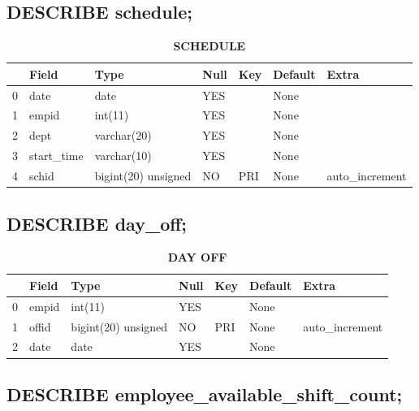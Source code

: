 \documentclass{article} %
\begin{document}
\subsection*{DESCRIBE schedule;}


\begin{table}[H]
	\centering
	\caption{\textbf{SCHEDULE}}
\begin{tabular}{|p{2cm}|p{2cm}|p{2cm}|p{2cm}|p{2cm}|p{2cm}|p{2cm}|}
	\hline
	\toprule
	{} &       Field &                 Type & Null &  Key & Default &           Extra \\
	\hline
	\midrule
	0 &        date &                 date &  YES &      &    None &                 \\
	1 &       empid &              int(11) &  YES &      &    None &                 \\
	2 &        dept &          varchar(20) &  YES &      &    None &                 \\
	3 &  start\_time &          varchar(10) &  YES &      &    None &                 \\
	4 &       schid &  bigint(20) unsigned &   NO &  PRI &    None &  auto\_increment \\
	\bottomrule
	\hline
\end{tabular}
\end{table}


\subsection*{DESCRIBE day\_off;}
\begin{table}[H]
	\centering
	\caption{\textbf{DAY OFF}}
\begin{tabular}{|p{2cm}|p{2cm}|p{2cm}|p{2cm}|p{2cm}|p{2cm}|p{2cm}|}
	\hline
	\toprule
	{} &  Field &                 Type & Null &  Key & Default &           Extra \\
	\hline
	\midrule
	0 &  empid &              int(11) &  YES &      &    None &                 \\
	1 &  offid &  bigint(20) unsigned &   NO &  PRI &    None &  auto\_increment \\
	2 &   date &                 date &  YES &      &    None &                 \\
	\hline
	\bottomrule
\end{tabular}
\end{table}


\subsection*{DESCRIBE employee\_available\_shift\_count;}
\end{document}
